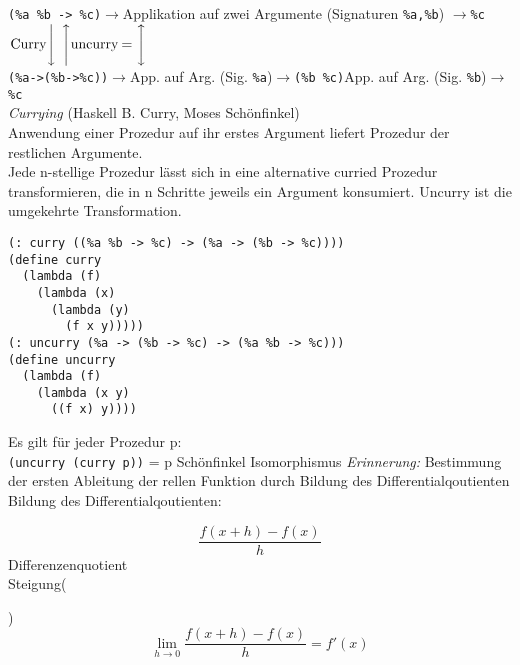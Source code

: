 
\lstinline|(%a %b -> %c)|$\longrightarrow$Applikation auf zwei Argumente (Signaturen \lstinline|%a,%b|) $\longrightarrow$\lstinline|%c|\\
$\left.{\text{Curry}}\Bigg\downarrow\right. \left.\Bigg\uparrow{\text{uncurry}}\right.$\hfill $=\Bigg\updownarrow$ \\
\lstinline|(%a->(%b->%c))|$\rightarrow$App. auf Arg. (Sig. \lstinline|%a|)$\rightarrow$\lstinline|(%b %c)|App. auf Arg. (Sig. \lstinline|%b|)$\rightarrow$\lstinline|%c|\\
\emph{Currying} (Haskell B. Curry, Moses Schönfinkel)\\
Anwendung einer Prozedur auf ihr erstes Argument liefert Prozedur der restlichen Argumente.\\
Jede n-stellige Prozedur lässt sich in eine alternative curried Prozedur transformieren, die in n Schritte jeweils ein Argument konsumiert. Uncurry ist die umgekehrte Transformation.
\begin{lstlisting}
(: curry ((%a %b -> %c) -> (%a -> (%b -> %c))))
(define curry
  (lambda (f)
    (lambda (x)
      (lambda (y)
        (f x y)))))
(: uncurry (%a -> (%b -> %c) -> (%a %b -> %c)))
(define uncurry
  (lambda (f)
    (lambda (x y)
      ((f x) y))))
\end{lstlisting}
Es gilt für jeder Prozedur p:\\
\lstinline|(uncurry (curry p))| = p \hfill \glqq Schönfinkel Isomorphismus \grqq
{}
\emph{Erinnerung:} Bestimmung der ersten Ableitung der rellen Funktion durch Bildung des Differentialqoutienten\\
Bildung des Differentialqoutienten:\\
\begin{minipage}[c]{0.6\textwidth}
\end{minipage}
\begin{minipage}[c]{0.4\textwidth}
\[ \frac{f(x+h) - f(x)}{h} \]
Differenzenquotient\\
Steigung()\\
$$\lim\limits_{h \to 0} \frac{f(x+h) - f(x)}{h} = f'(x)$$
\end{minipage}
